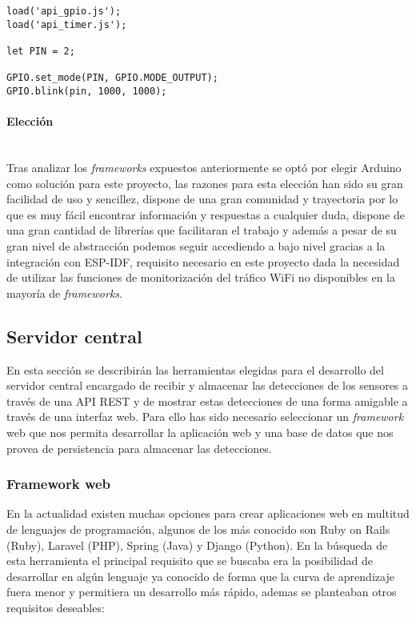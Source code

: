 \documentclass[../proyecto.tex]{subfiles}
\begin{document}
\begin{minipage}{\linewidth}
\begin{lstlisting}[caption=Ejemplo de código para hacer parpadear un led con Moongose, captionpos=b, frame=single]
load('api_gpio.js');
load('api_timer.js');

let PIN = 2;

GPIO.set_mode(PIN, GPIO.MODE_OUTPUT);
GPIO.blink(pin, 1000, 1000);
\end{lstlisting}
\end{minipage}

\paragraph{Elección}\mbox{}\\

Tras analizar los \textit{frameworks} expuestos anteriormente se optó por elegir Arduino como solución para este proyecto, las razones para esta elección han sido su gran facilidad de uso  y sencillez, dispone de una gran comunidad y trayectoria por lo que es muy fácil encontrar información y respuestas a cualquier duda, dispone de una gran cantidad de librerías que facilitaran el trabajo y además a pesar de su gran nivel de abstracción podemos seguir accediendo a bajo nivel gracias a la integración con ESP-IDF, requisito necesario en este proyecto dada la necesidad de utilizar las funciones de monitorización del tráfico WiFi no disponibles en la mayoría de \textit{frameworks}.

\subsection{Servidor central}

En esta sección se describirán las herramientas elegidas para el desarrollo del servidor central encargado de recibir y almacenar las detecciones de los sensores a través de una API REST y de mostrar estas detecciones de una forma amigable a través de una interfaz web. Para ello has sido necesario seleccionar un \textit{framework} web que nos permita desarrollar la aplicación web y una base de datos que nos provea de persistencia para almacenar las detecciones.

\subsubsection{Framework web}

En la actualidad existen muchas opciones para crear aplicaciones web en multitud de lenguajes de programación, algunos de los más conocido son Ruby on Rails (Ruby), Laravel (PHP), Spring (Java) y Django (Python). En la búsqueda de esta herramienta el principal requisito que se buscaba era la posibilidad de desarrollar en algún lenguaje ya conocido de forma que la curva de aprendizaje fuera menor y permitiera un desarrollo más rápido, ademas se planteaban otros requisitos deseables:
\end{document}

